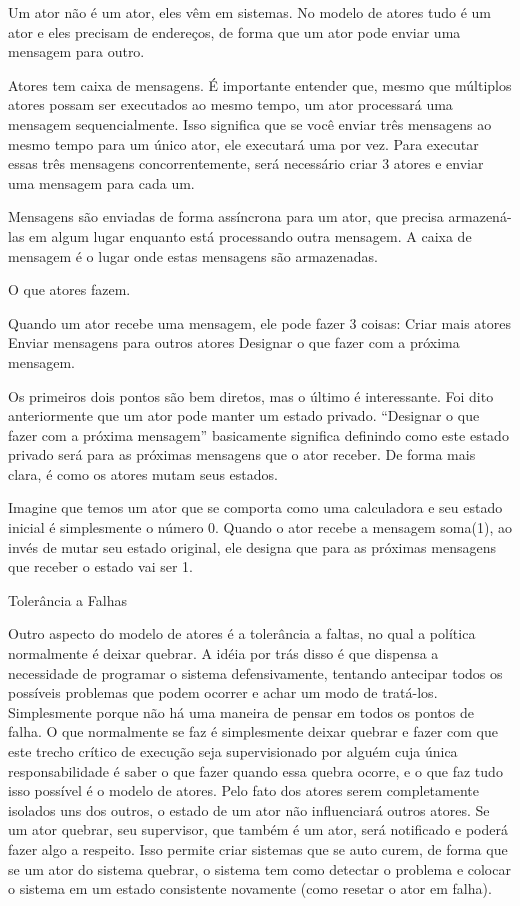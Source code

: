 Um ator não é um ator, eles vêm em sistemas. No modelo de atores tudo é um ator e eles precisam de endereços, de forma que um ator pode enviar uma mensagem para outro.

Atores tem caixa de mensagens.
É importante entender que, mesmo que múltiplos atores possam ser executados ao mesmo tempo, um ator processará uma mensagem sequencialmente. Isso significa que se você enviar três mensagens ao mesmo tempo para um único ator, ele executará uma por vez. Para executar essas três mensagens concorrentemente, será necessário criar 3 atores e enviar uma mensagem para cada um.

Mensagens são enviadas de forma assíncrona para um ator, que precisa armazená-las em algum lugar enquanto está processando outra mensagem. A caixa de mensagem é o lugar onde estas mensagens são armazenadas.

O que atores fazem.

Quando um ator recebe uma mensagem, ele pode fazer 3 coisas:
Criar mais atores
Enviar mensagens para outros atores
Designar o que fazer com a próxima mensagem.

Os primeiros dois pontos são bem diretos, mas o último é interessante.
Foi dito anteriormente que um ator pode manter um estado privado. “Designar o que fazer com a próxima mensagem” basicamente significa definindo como este estado privado será para as próximas mensagens que o ator receber. De forma mais clara, é como os atores mutam seus estados.

Imagine que temos um ator que se comporta como uma calculadora e seu estado inicial é simplesmente o número 0. Quando o ator recebe a mensagem soma(1), ao invés de mutar seu estado original, ele designa que para as próximas mensagens que receber o estado vai ser 1.

Tolerância a Falhas

Outro aspecto do modelo de atores é a tolerância a faltas, no qual a política normalmente é deixar quebrar. A idéia por trás disso é que dispensa a necessidade de programar o sistema defensivamente, tentando antecipar todos os possíveis problemas que podem ocorrer e achar um modo de tratá-los. Simplesmente porque não há uma maneira de pensar em todos os pontos de falha.
O que normalmente se faz é simplesmente deixar quebrar e fazer com que este trecho crítico de execução seja supervisionado por alguém cuja única responsabilidade é saber o que fazer quando essa quebra ocorre, e o que faz tudo isso possível é o modelo de atores. Pelo fato dos atores serem completamente isolados uns dos outros, o estado de um ator não influenciará outros atores. Se um ator quebrar, seu supervisor, que também é um ator, será notificado e poderá fazer algo a respeito. 
Isso permite criar sistemas que se auto curem, de forma que se um ator do sistema quebrar, o sistema tem como detectar o problema e colocar o sistema em um estado consistente novamente (como resetar o ator em falha).

